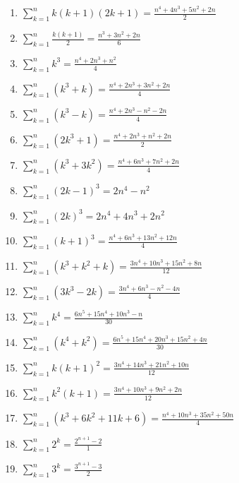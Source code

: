 \documentclass[11pt,a4paper]{article}
\begin{document}
\begin{enumerate}
\item $\displaystyle \sum_{k=1}^{n} k\left(k + 1\right)\left(2k + 1\right) = \frac{n^{4} + 4n^{3} + 5n^{2} + 2n}{2}$
\item $\displaystyle \sum_{k=1}^{n} \frac{k\left(k + 1\right)}{2} = \frac{n^{3} + 3n^{2} + 2n}{6}$
\item $\displaystyle \sum_{k=1}^{n} k^{3} = \frac{n^{4} + 2n^{3} + n^{2}}{4}$
\item $\displaystyle \sum_{k=1}^{n} \left(k^{3} + k\right) = \frac{n^{4} + 2n^{3} + 3n^{2} + 2n}{4}$
\item $\displaystyle \sum_{k=1}^{n} \left(k^{3} - k\right) = \frac{n^{4} + 2n^{3} - n^{2} - 2n}{4}$
\item $\displaystyle \sum_{k=1}^{n} \left(2k^{3} + 1\right) = \frac{n^{4} + 2n^{3} + n^{2} + 2n}{2}$
\item $\displaystyle \sum_{k=1}^{n} \left(k^{3} + 3k^{2}\right) = \frac{n^{4} + 6n^{3} + 7n^{2} + 2n}{4}$
\item $\displaystyle \sum_{k=1}^{n} \left(2k - 1\right)^{3} = 2n^{4} - n^{2}$
\item $\displaystyle \sum_{k=1}^{n} \left(2k\right)^{3} = 2n^{4} + 4n^{3} + 2n^{2}$
\item $\displaystyle \sum_{k=1}^{n} \left(k + 1\right)^{3} = \frac{n^{4} + 6n^{3} + 13n^{2} + 12n}{4}$
\item $\displaystyle \sum_{k=1}^{n} \left(k^{3} + k^{2} + k\right) = \frac{3n^{4} + 10n^{3} + 15n^{2} + 8n}{12}$
\item $\displaystyle \sum_{k=1}^{n} \left(3k^{3} - 2k\right) = \frac{3n^{4} + 6n^{3} - n^{2} - 4n}{4}$
\item $\displaystyle \sum_{k=1}^{n} k^{4} = \frac{6n^{5} + 15n^{4} + 10n^{3} - n}{30}$
\item $\displaystyle \sum_{k=1}^{n} \left(k^{4} + k^{2}\right) = \frac{6n^{5} + 15n^{4} + 20n^{3} + 15n^{2} + 4n}{30}$
\item $\displaystyle \sum_{k=1}^{n} k\left(k + 1\right)^{2} = \frac{3n^{4} + 14n^{3} + 21n^{2} + 10n}{12}$
\item $\displaystyle \sum_{k=1}^{n} k^{2}\left(k + 1\right) = \frac{3n^{4} + 10n^{3} + 9n^{2} + 2n}{12}$
\item $\displaystyle \sum_{k=1}^{n} \left(k^{3} + 6k^{2} + 11k + 6\right) = \frac{n^{4} + 10n^{3} + 35n^{2} + 50n}{4}$
\item $\displaystyle \sum_{k=1}^{n} 2^{k} = \frac{2^{n + 1} - 2}{1}$
\item $\displaystyle \sum_{k=1}^{n} 3^{k} = \frac{3^{n + 1} - 3}{2}$

\end{enumerate}
\end{document}
